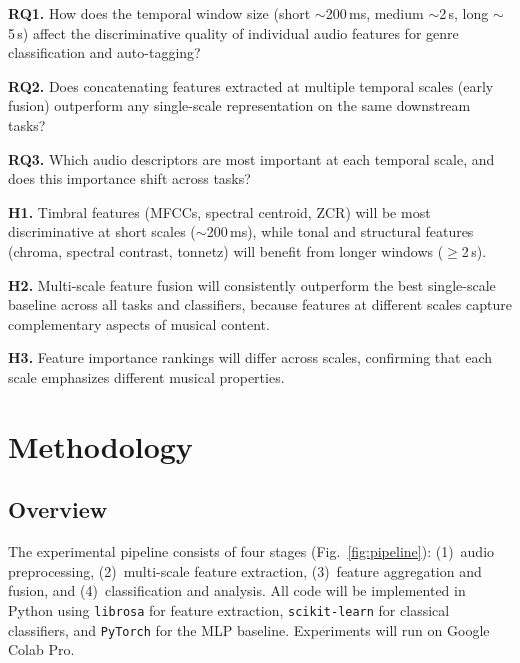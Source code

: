 \documentclass[conference]{IEEEtran}
\begin{document}
\textbf{RQ1.} How does the temporal window size (short $\sim$200\,ms, medium $\sim$2\,s, long $\sim$5\,s) affect the discriminative quality of individual audio features for genre classification and auto-tagging?

\textbf{RQ2.} Does concatenating features extracted at multiple temporal scales (early fusion) outperform any single-scale representation on the same downstream tasks?

\textbf{RQ3.} Which audio descriptors are most important at each temporal scale, and does this importance shift across tasks?

\medskip
\noindent\textbf{H1.} Timbral features (MFCCs, spectral centroid, ZCR) will be most discriminative at short scales ($\sim$200\,ms), while tonal and structural features (chroma, spectral contrast, tonnetz) will benefit from longer windows ($\geq$2\,s).

\noindent\textbf{H2.} Multi-scale feature fusion will consistently outperform the best single-scale baseline across all tasks and classifiers, because features at different scales capture complementary aspects of musical content.

\noindent\textbf{H3.} Feature importance rankings will differ across scales, confirming that each scale emphasizes different musical properties.

\section{Methodology}

\subsection{Overview}

The experimental pipeline consists of four stages (Fig.~\ref{fig:pipeline}): (1)~audio preprocessing, (2)~multi-scale feature extraction, (3)~feature aggregation and fusion, and (4)~classification and analysis.
All code will be implemented in Python using \texttt{librosa} \cite{mcfee2015librosa} for feature extraction, \texttt{scikit-learn} for classical classifiers, and \texttt{PyTorch} for the MLP baseline.
Experiments will run on Google Colab Pro.
\end{document}
